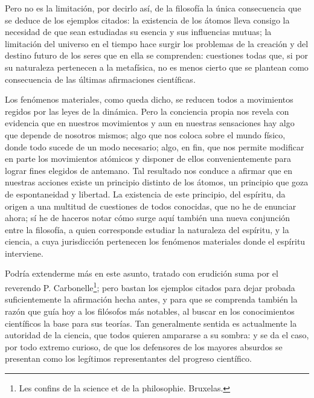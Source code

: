 \documentclass[a4paper, 12pt]{article}
\begin{document}
Pero no es la limitación, por decirlo así, de la filosofía la única consecuencia que se deduce de los ejemplos citados: la existencia de los átomos lleva consigo la necesidad de que sean estudiadas su esencia y sus influencias mutuas; la limitación del universo en el tiempo hace surgir los problemas de la creación y del destino futuro de los seres que en ella se comprenden: cuestiones todas que, si por su naturaleza pertenecen a la metafísica, no es menos cierto que se plantean como consecuencia de las últimas afirmaciones científicas.

Los fenómenos materiales, como queda dicho, se reducen todos a movimientos regidos por las leyes de la dinámica. Pero la conciencia propia nos revela con evidencia que en nuestros movimientos y aun en nuestras sensaciones hay algo que depende de nosotros mismos; algo que nos coloca sobre el mundo físico, donde todo sucede de un modo necesario; algo, en fin, que nos permite modificar en parte los movimientos atómicos y disponer de ellos convenientemente para lograr fines elegidos de antemano. Tal resultado nos conduce a afirmar que en nuestras acciones existe un principio distinto de los átomos, un principio que goza de espontaneidad y libertad. La existencia de este principio, del espíritu, da origen a una multitud de cuestiones de todos conocidas, que no he de enunciar ahora; sí he de haceros notar cómo surge aquí también una nueva conjunción entre la filosofía, a quien corresponde estudiar la naturaleza del espíritu, y la ciencia, a cuya jurisdicción pertenecen los fenómenos materiales donde el espíritu interviene.

Podría extenderme más en este asunto, tratado con erudición suma por el reverendo P. Carbonelle\footnote{Les confins de la science et de la philosophie. Bruxelas.}; pero bastan los ejemplos citados para dejar probada suficientemente la afirmación hecha antes, y para que se comprenda también la razón que guía hoy a los filósofos más notables, al buscar en los conocimientos científicos la base para sus teorías. Tan generalmente sentida es actualmente la autoridad de la ciencia, que todos quieren ampararse a su sombra: y se da el caso, por todo extremo curioso, de que los defensores de los mayores absurdos se presentan como los legítimos representantes del progreso científico.
\end{document}
